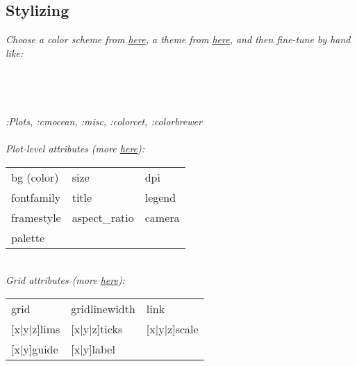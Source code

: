 \subsection*{Stylizing}
\textit{Choose a color scheme from \href{https://docs.juliaplots.org/latest/generated/plotthemes/}{here}, a theme from \href{https://docs.juliaplots.org/latest/generated/plotthemes/}{here}, and then fine-tune by hand like:} \\
 \\
 \\
 \\
\\ 
\textit{:Plots, :cmocean, :misc, :colorcet, :colorbrewer} \\
 \\

\textit{Plot-level attributes (more \href{https://docs.juliaplots.org/latest/generated/attributes\_plot/}{here}):}\\
{\scriptsize
\begin{tabular}{l l l}
    bg (color)      & size          & dpi \\
    fontfamily      & title         & legend \\
    framestyle      & aspect\_ratio & camera \\
    palette         \\
\end{tabular}
}\\
\textit{Grid attributes (more \href{https://docs.juliaplots.org/latest/generated/attributes\_plot/}{here}):}\\
{\scriptsize
\begin{tabular}{l l l}
    grid            & gridlinewidth         & link \\
    {[x|y|z]}lims     & [x|y|z]ticks          & [x|y|z]scale\\
    {[x|y]}guide      & [x|y]label \\
\end{tabular}
}

